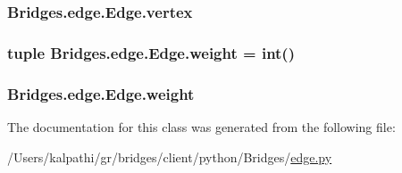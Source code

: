 \subsubsection[{vertex}]{\setlength{\rightskip}{0pt plus 5cm}Bridges.\+edge.\+Edge.\+vertex}\label{class_bridges_1_1edge_1_1_edge_a785d6e63ec4a7ec1b49c9e4a81a802dc}
\hypertarget{class_bridges_1_1edge_1_1_edge_a4fb568704945fe2cc8fbb1f5c5e807cd}{}
\subsubsection[{weight}]{\setlength{\rightskip}{0pt plus 5cm}tuple Bridges.\+edge.\+Edge.\+weight = int()\hspace{0.3cm}{\ttfamily [static]}}\label{class_bridges_1_1edge_1_1_edge_a4fb568704945fe2cc8fbb1f5c5e807cd}
\hypertarget{class_bridges_1_1edge_1_1_edge_a36787799fbbb1cd17fe1944d92513524}{}
\subsubsection[{weight}]{\setlength{\rightskip}{0pt plus 5cm}Bridges.\+edge.\+Edge.\+weight}\label{class_bridges_1_1edge_1_1_edge_a36787799fbbb1cd17fe1944d92513524}


The documentation for this class was generated from the following file\+:\begin{DoxyCompactItemize}
\item 
/\+Users/kalpathi/gr/bridges/client/python/\+Bridges/\hyperlink{edge_8py}{edge.\+py}\end{DoxyCompactItemize}
